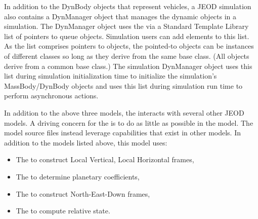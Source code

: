 In addition to the DynBody objects that represent vehicles,
a JEOD simulation also contains a DynManager object that manages the
dynamic objects in a simulation.
The DynManager object uses the \ModelDesc via a Standard Template Library
list of pointers to queue \ModelDesc objects. Simulation users can add
elements to this list. As the list comprises pointers to objects, the
pointed-to objects can be instances of different classes so long as
they derive from the same base class. (All \ModelDesc objects derive
from a common base class.)
The simulation DynManager object uses this list during simulation
initialization time to initialize the simulation's MassBody/DynBody objects
and uses this list during simulation run time to perform
asynchronous actions.

In addition to the above three models, the \ModelDesc interacts with
several other JEOD models. A driving concern for the \ModelDesc is to
do as little as possible in the model.
The model source files instead leverage capabilities that exist in other
models.
In addition to the models listed above, this model uses:
\begin{itemize}
\item The 
to construct Local Vertical, Local Horizontal frames,
\item The 
to determine planetary coefficients,
\item The 
to construct North-East-Down frames,
\item The 
to compute relative state.
\end{itemize}


